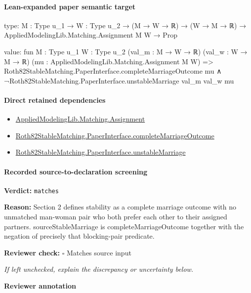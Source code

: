 \documentclass[10pt]{article}
\newcommand{\reviewerbox}{%
  \par\noindent\fbox{\parbox{0.96\linewidth}{\rule{0pt}{0.38in}}}\par
}
\newcommand{\reviewmatch}[1]{%
  \par\noindent\textbf{Reviewer check:} $\square$\; #1\par
  \noindent\emph{If left unchecked, explain the discrepancy or uncertainty below.}\par
}
\begin{document}
\paragraph{Lean-expanded paper semantic target}
\begin{ReviewVerbatim}
type:
{M : Type u_1} → {W : Type u_2} → (M → W → ℝ) → (W → M → ℝ) → AppliedModelingLib.Matching.Assignment M W → Prop

value:
fun {M : Type u_1} {W : Type u_2} (val_m : M → W → ℝ) (val_w : W → M → ℝ)
    (mu : AppliedModelingLib.Matching.Assignment M W) =>
  Roth82StableMatching.PaperInterface.completeMarriageOutcome mu ∧
    ¬Roth82StableMatching.PaperInterface.unstableMarriage val_m val_w mu
\end{ReviewVerbatim}

\paragraph{Direct retained dependencies}
\begin{itemize}\raggedright
\item \hyperlink{governing-declaration-508c084086b006b8}{Applied\allowbreak{}Modeling\allowbreak{}Lib.\allowbreak{}Matching.\allowbreak{}Assignment}
\item \hyperlink{paper-prerequisite-efa58a68b1c17a47}{Roth82\allowbreak{}Stable\allowbreak{}Matching.\allowbreak{}Paper\allowbreak{}Interface.\allowbreak{}complete\allowbreak{}Marriage\allowbreak{}Outcome}
\item \hyperlink{governing-declaration-dfbb1ea119053a17}{Roth82\allowbreak{}Stable\allowbreak{}Matching.\allowbreak{}Paper\allowbreak{}Interface.\allowbreak{}unstable\allowbreak{}Marriage}
\end{itemize}
\paragraph{Recorded source-to-declaration screening}
\textbf{Verdict:} \texttt{matches}
\\
{\raggedright
\textbf{Reason:} Section 2 defines stability as a complete marriage outcome with no unmatched man-\allowbreak{}woman pair who both prefer each other to their assigned partners.\allowbreak{}  sourceStableMarriage is completeMarriageOutcome together with the negation of precisely that blocking-\allowbreak{}pair predicate.\allowbreak{}
\par}
\reviewmatch{Matches source input}
\noindent\textbf{Reviewer annotation}\par
\reviewerbox
\clearpage
\hypertarget{paper-prerequisite-44aa864d4a515095}{}
\end{document}
